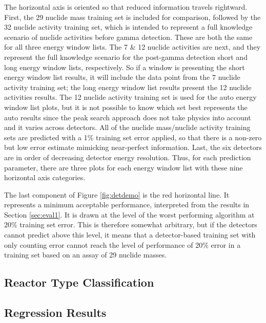 The horizontal axis is oriented so that reduced information travels rightward.
First, the 29 nuclide mass training set is included for comparison, followed by
the 32 nuclide activity training set, which is intended to represent a full
knowledge scenario of nuclide activities before gamma detection. These are both
the same for all three energy window lists.  The 7 \& 12 nuclide activities are
next, and they represent the full knowledge scenario for the post-gamma
detection short and long energy window lists, respectively.  So if a window is
presenting the short energy window list results, it will include the data point
from the 7 nuclide activity training set; the long energy window list results
present the 12 nuclide activities results. The 12 nuclide activity training set
is used for the auto energy window list plots, but it is not possible to know
which set best represents the auto results since the peak search approach does
not take physics into account and it varies across detectors. All of the
nuclide mass/nuclide activity training sets are predicted with a 1\% training
set error applied, so that there is a non-zero but low error estimate mimicking
near-perfect information.  Last, the six detectors are in order of decreasing
detector energy resolution. Thus, for each prediction parameter, there are
three plots for each energy window list with these nine horizontal axis
categories. 

The last component of Figure \ref{fig:detdemo} is the red horizontal line.  It
represents a minimum acceptable performance, interpreted from the results in
Section \ref{sec:eval1}. It is drawn at the level of the worst performing
algorithm at 20\% training set error.  This is therefore somewhat arbitrary,
but if the detectors cannot predict above this level, it means that a
detector-based training set with only counting error cannot reach the level of
performance of 20\% error in a training set based on an assay of 29 nuclide
masses.

\subsection{Reactor Type Classification}

\label{sec:exp2_rxtr}

\subsection{Regression Results}

\label{sec:exp2_reg}
